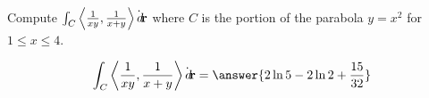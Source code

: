 \documentclass{ximera}
\author{David Guichard \and Neal Koblitz \and H. Jerome Keisler \and Albert Scheller \and Barry Balof \and Mike Wills \and Matthew Carr}
\begin{document}
\begin{exercise}




Compute $\int_C \left\langle \frac{1}{xy},\frac{1}{x+y}\right\rangle\dot{\mathop{}\!d\!}\mathbf{r}$ where $C$ is the portion of the parabola $y=x^2$ for $1\le x\le 4$.

\begin{prompt}
\[
\int_C \vector{\frac{1}{xy},\frac{1}{x+y}}\dot\d\vec{r}=\answer{2\ln 5-2\ln 2+\frac{15}{32}}
\]
\end{prompt}



\end{exercise}
\end{document}
